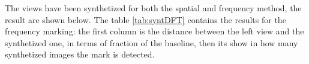 The views have been synthetized for both the spatial and frequency method, the result are shown below.\newline
The table \ref{tab:syntDFT} contains the results for the frequency marking: the first column is the distance between the left view and the synthetized one, in terms of fraction of the baseline, then its show in how many synthetized images the mark is detected.

\begin{table}[htbp]

 \begin{center}
 \caption{ \label{tab:syntDFT}}
 \end{center}
 \end{table}
 
